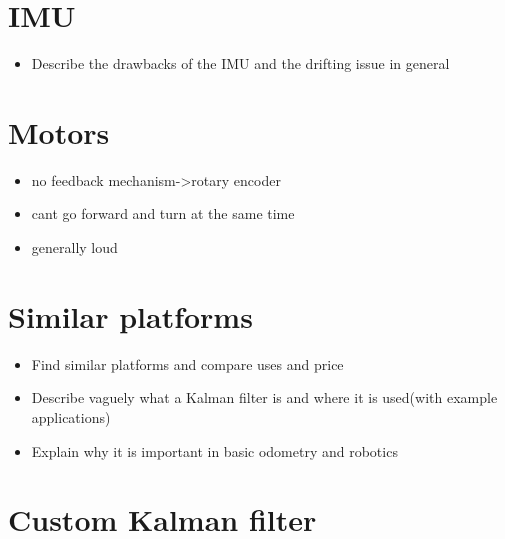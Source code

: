 \section{IMU}\label{imu_lim}
\begin{itemize}
 \item Describe the drawbacks of the IMU and the drifting issue in general
\end{itemize}

\section{Motors}\label{motor_lim}
\begin{itemize}
 \item no feedback mechanism->rotary encoder
 \item cant go forward and turn at the same time
 \item generally loud
\end{itemize}

\section{Similar platforms}\label{sec:similar_platforms}
\begin{itemize}
 \item Find similar platforms and compare uses and price
\end{itemize}


\begin{itemize}
 \item Describe vaguely what a Kalman filter is and where it is used(with example applications)
 \item Explain why it is important in basic odometry and robotics
\end{itemize}

\section{Custom Kalman filter}\label{sec:custom_kalman}

